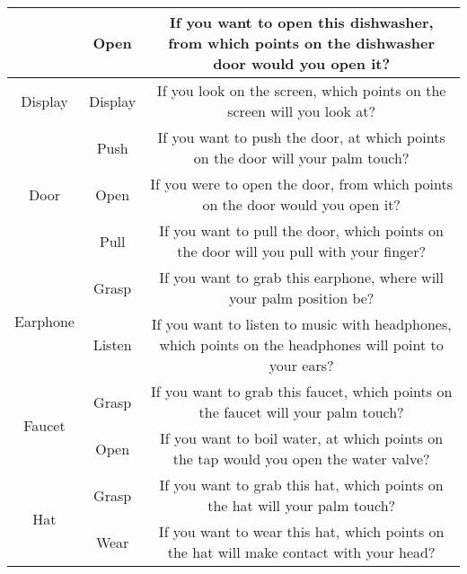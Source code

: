 \documentclass[final]{cvpr}
\begin{document}
\begin{table*}[t]
{\begin{tabular}{c|c|c}
                                      & Open                & If you want to open this dishwasher, from which points on the dishwasher door would you open it?                                                 \\ \hline
    Display                           & Display             & If you look on the screen, which points on the screen will you look at?                                                                          \\ \hline
    \multirow{3}{*}{Door}             & Push                & If you want to push the door, at which points on the door will your palm touch?                                                                  \\
                                      & Open                & If you were to open the door, from which points on the door would you open it?                                                                   \\
                                      & Pull                & If you want to pull the door, which points on the door will you pull with your finger?                                                           \\ \hline
    \multirow{2}{*}{Earphone}         & Grasp               & If you want to grab this earphone, where will your palm position be?                                                                             \\
                                      & Listen              & If you want to listen to music with headphones, which points on the headphones will point to your ears?                                          \\ \hline
    \multirow{2}{*}{Faucet}           & Grasp               & If you want to grab this faucet, which points on the faucet will your palm touch?                                                                \\
                                      & Open                & If you want to boil water, at which points on the tap would you open the water valve?                                                            \\ \hline
    \multirow{2}{*}{Hat}              & Grasp               & If you want to grab this hat, which points on the hat will your palm touch?                                                                      \\
                                      & Wear                & If you want to wear this hat, which points on the hat will make contact with your head?                                                          \\ \hline

\end{tabular}}
\end{table*}
\end{document}
